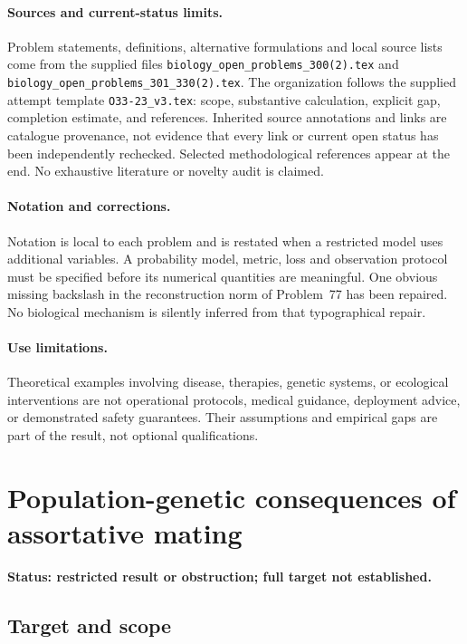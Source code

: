 \documentclass[11pt]{article}
\begin{document}
\paragraph{Sources and current-status limits.}
Problem statements, definitions, alternative formulations and local source lists
come from the supplied files
\texttt{biology\_open\_problems\_300(2).tex} and
\texttt{biology\_open\_problems\_301\_330(2).tex}.
The organization follows the supplied attempt template
\texttt{O33-23\_v3.tex}: scope, substantive calculation, explicit gap,
completion estimate, and references. Inherited source annotations and links are
catalogue provenance, not evidence that every link or current open status has
been independently rechecked. Selected methodological references appear at the
end. No exhaustive literature or novelty audit is claimed.

\paragraph{Notation and corrections.}
Notation is local to each problem and is restated when a restricted model uses
additional variables. A probability model, metric, loss and observation protocol
must be specified before its numerical quantities are meaningful. One obvious
missing backslash in the reconstruction norm of Problem~77 has been repaired.
No biological mechanism is silently inferred from that typographical repair.

\paragraph{Use limitations.}
Theoretical examples involving disease, therapies, genetic systems, or ecological
interventions are not operational protocols, medical guidance, deployment advice,
or demonstrated safety guarantees. Their assumptions and empirical gaps are part
of the result, not optional qualifications.


\section*{Population-genetic consequences of assortative mating}
\label{prob:173}
\noindent\textbf{Status: restricted result or obstruction; full target not established.}
\subsection{Target and scope}
\end{document}

